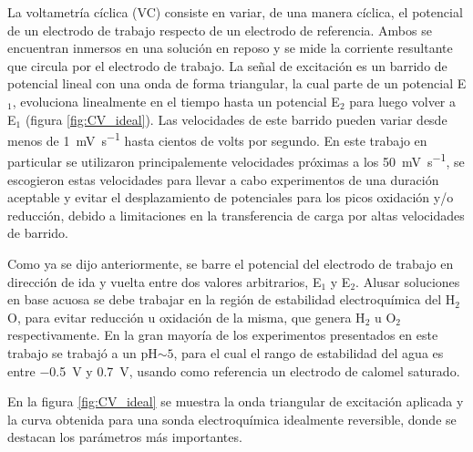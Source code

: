 	 		La voltametría cíclica (VC) consiste en variar, de una manera cíclica, el potencial de un electrodo de trabajo respecto de un electrodo de referencia. Ambos se encuentran inmersos en una solución en reposo y se mide la corriente resultante que circula por el electrodo de trabajo. La señal de excitación es un barrido de potencial lineal con una onda de forma triangular, la cual parte de un potencial E$_1$, evoluciona linealmente en el tiempo hasta un potencial E$_2$ para luego volver a E$_1$ (figura \ref{fig:CV_ideal}). Las velocidades de este barrido pueden variar desde menos de \SI{1}{\milli\volt.\second^{-1}} hasta cientos de volts por segundo. En este trabajo en particular se utilizaron principalemente velocidades próximas a los \SI{50}{\milli\volt.\second^{-1}}, se escogieron estas velocidades para llevar a cabo experimentos de una duración aceptable y evitar el desplazamiento de potenciales para los picos oxidación y/o reducción, debido a limitaciones en la transferencia de carga por altas velocidades de barrido. \cite{nicholson1964,Gewirth2004}

	 		Como ya se dijo anteriormente, se barre el potencial del electrodo de trabajo en dirección de ida y vuelta entre dos valores arbitrarios, E$_1$ y E$_2$. Al\space usar soluciones en base acuosa se debe trabajar en la región de estabilidad electroquímica del H$_2$O, para evitar reducción u oxidación de la misma, que genera H$_2$ u O$_2$ respectivamente. En la gran mayoría de los experimentos presentados en este trabajo se trabajó a un pH$\sim 5$, para el cual el rango de estabilidad del agua es entre \SI{-0.5}{\volt} y \SI{0.7}{\volt}, usando como referencia un electrodo de calomel saturado.\cite{wang2014} 

			En la figura \ref{fig:CV_ideal} se muestra la onda triangular de excitación aplicada y la curva obtenida para una sonda electroquímica idealmente reversible, donde se destacan los parámetros más importantes. 

